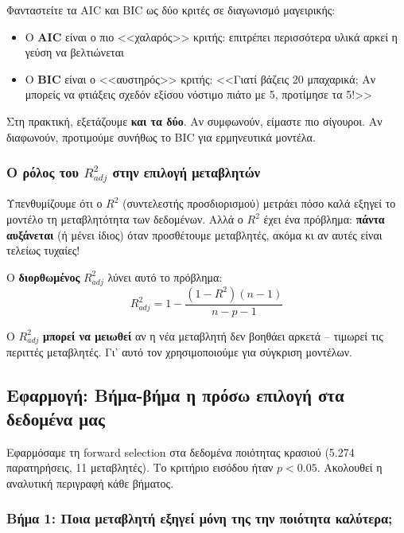 \documentclass[12pt,a4paper]{article}
\begin{document}
\begin{examplebox}
Φανταστείτε τα AIC και BIC ως δύο κριτές σε διαγωνισμό μαγειρικής:
\begin{itemize}
    \item Ο \textbf{AIC} είναι ο πιο <<χαλαρός>> κριτής: επιτρέπει περισσότερα υλικά αρκεί η γεύση να βελτιώνεται
    \item Ο \textbf{BIC} είναι ο <<αυστηρός>> κριτής: <<Γιατί βάζεις 20 μπαχαρικά; Αν μπορείς να φτιάξεις σχεδόν εξίσου νόστιμο πιάτο με 5, προτίμησε τα 5!>>
\end{itemize}
Στη πρακτική, εξετάζουμε \textbf{και τα δύο}. Αν συμφωνούν, είμαστε πιο σίγουροι. Αν διαφωνούν, προτιμούμε συνήθως το BIC για ερμηνευτικά μοντέλα.
\end{examplebox}

\subsubsection{Ο ρόλος του $R^2_{adj}$ στην επιλογή μεταβλητών}

\begin{theorybox}
Υπενθυμίζουμε ότι ο $R^2$ (συντελεστής προσδιορισμού) μετράει πόσο καλά εξηγεί το μοντέλο τη μεταβλητότητα των δεδομένων. Αλλά ο $R^2$ έχει ένα πρόβλημα: \textbf{πάντα αυξάνεται} (ή μένει ίδιος) όταν προσθέτουμε μεταβλητές, ακόμα κι αν αυτές είναι τελείως τυχαίες!

Ο \textbf{διορθωμένος} $R^2_{adj}$ λύνει αυτό το πρόβλημα:
\begin{equation}
R^2_{adj} = 1 - \frac{(1 - R^2)(n - 1)}{n - p - 1}
\end{equation}

Ο $R^2_{adj}$ \textbf{μπορεί να μειωθεί} αν η νέα μεταβλητή δεν βοηθάει αρκετά -- τιμωρεί τις περιττές μεταβλητές. Γι' αυτό τον χρησιμοποιούμε για σύγκριση μοντέλων.
\end{theorybox}

\subsection{Εφαρμογή: Βήμα-βήμα η πρόσω επιλογή στα δεδομένα μας}

Εφαρμόσαμε τη forward selection στα δεδομένα ποιότητας κρασιού (5.274 παρατηρήσεις, 11 μεταβλητές). Το κριτήριο εισόδου ήταν $p < 0.05$. Ακολουθεί η αναλυτική περιγραφή κάθε βήματος.

\subsubsection{Βήμα 1: Ποια μεταβλητή εξηγεί μόνη της την ποιότητα καλύτερα;}
\end{document}
